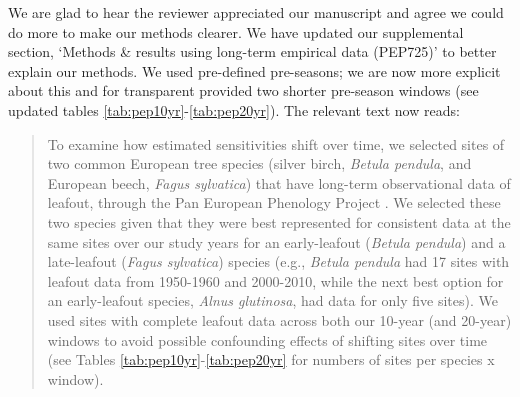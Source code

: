 \documentclass[11pt,letter]{article}
\begin{document}
We are glad to hear the reviewer appreciated our manuscript and agree we could do more to make our methods clearer. We have updated our supplemental section, `Methods \& results using long-term empirical data (PEP725)' to better explain our methods. We used pre-defined pre-seasons; we are now more explicit about this and for transparent provided two shorter pre-season windows (see updated tables \ref{tab:pep10yr}-\ref{tab:pep20yr}). The relevant text now reads:
\begin{quote}
To examine how estimated sensitivities shift over time, we selected sites of two common European tree species (silver birch, \emph{Betula pendula}, and European beech, \emph{Fagus sylvatica}) that have long-term observational data of leafout, through the Pan European Phenology Project \citep[PEP725,][]{Templ2018}. We selected these two species given that they were best represented for consistent data at the same sites over our study years for an early-leafout (\emph{Betula pendula}) and a late-leafout (\emph{Fagus sylvatica}) species (e.g., \emph{Betula pendula} had 17 sites with leafout data from 1950-1960 and 2000-2010, while the next best option for an early-leafout species, \emph{Alnus glutinosa}, had data for only five sites). We used sites with complete leafout data across both our 10-year (and 20-year) windows to avoid possible confounding effects of shifting sites over time (see Tables \ref{tab:pep10yr}-\ref{tab:pep20yr} for numbers of sites per species x window). \\


\end{quote}
\end{document}
